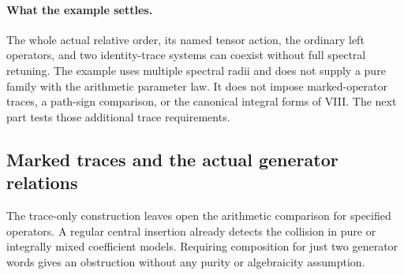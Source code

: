 \documentclass[11pt,a4paper]{article}
\theoremstyle{named}\newtheorem{finding}{Finding}[section]
\theoremstyle{definition}\newtheorem{definition}[finding]{Definition}
\theoremstyle{remark}\newtheorem{remark}[finding]{Remark}
\begin{document}
\paragraph{What the example settles.}
The whole actual relative order, its named tensor action,
the ordinary left operators, and two identity-trace systems
can coexist without full spectral retuning.
The example uses multiple spectral radii and does not
supply a pure family with the arithmetic parameter law.
It does not impose marked-operator traces, a path-sign
comparison, or the canonical integral forms of VIII.
The next part tests those additional trace requirements.

\subsection{Marked traces and the actual generator relations}
The trace-only construction leaves open the arithmetic
comparison for specified operators. A regular central
insertion already detects the collision in pure or
integrally mixed coefficient models. Requiring composition
for just two generator words gives an obstruction without
any purity or algebraicity assumption.
\end{document}

